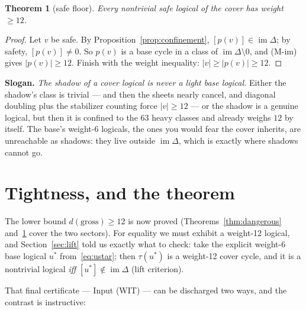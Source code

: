 \documentclass[11pt]{article}
\theoremstyle{plain}
\newtheorem{theorem}{Theorem}[section]
\theoremstyle{definition}
\theoremstyle{remark}
\newcommand{\imD}{\operatorname{im}\Delta}
\newcommand{\wt}[1]{\lvert #1\rvert}
\begin{document}
\begin{theorem}[safe floor]\label{thm:safe}
Every nontrivial safe logical of the cover has weight $\geq 12$.
\end{theorem}

\begin{proof}
Let $v$ be safe. By Proposition~\ref{prop:confinement}, $[p(v)] \in \imD$;
by safety, $[p(v)] \neq 0$. So $p(v)$ is a base cycle in a class of $\imD
\setminus 0$, and (M-im) gives $\wt{p(v)} \geq 12$. Finish with the weight
inequality: $\wt{v} \geq \wt{p(v)} \geq 12$.
\end{proof}

\begin{sloganbox}
\textbf{Slogan.} \emph{The shadow of a cover logical is never a light base
logical.} Either the shadow's class is trivial --- and then the sheets nearly
cancel, and diagonal doubling plus the stabilizer counting force $\wt{v} \geq
12$ --- or the shadow is a genuine logical, but then it is confined to the
$63$ heavy classes and already weighs $12$ by itself. The base's weight-6
logicals, the ones you would fear the cover inherits, are unreachable as
shadows: they live outside $\imD$, which is exactly where shadows cannot go.
\end{sloganbox}

\section{Tightness, and the theorem}
\label{sec:tightness}

The lower bound $d(\mathrm{gross}) \geq 12$ is now proved
(Theorems~\ref{thm:dangerous} and~\ref{thm:safe} cover the two sectors). For
equality we must exhibit a weight-12 logical, and Section~\ref{sec:lift} told
us exactly what to check: take the explicit weight-6 base logical $u^*$
from~\eqref{eq:ustar}; then $\tau(u^*)$ is a weight-12 cover cycle, and it is
a nontrivial logical \emph{iff} $[u^*] \notin \imD$ (lift criterion).

That final certificate --- Input (WIT) --- can be discharged two ways, and the
contrast is instructive:
\end{document}
